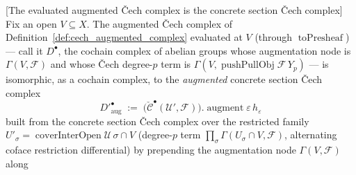 \begin{lemma}

[The evaluated augmented {\v C}ech complex is the concrete section {\v C}ech complex]
  \label{lem:cechSection_complex_iso}
  Fix an open \(V \subseteq X\). The augmented {\v C}ech complex of
  Definition~\ref{def:cech_augmented_complex} evaluated at \(V\) (through
  \(\operatorname{toPresheaf}\)) --- call it \(D^\bullet\), the cochain complex of abelian
  groups whose augmentation node is \(\Gamma(V, \mathcal{F})\) and whose {\v C}ech degree-\(p\)
  term is \(\Gamma(V, \operatorname{pushPullObj}\mathcal{F}\,Y_p)\) --- is isomorphic, as a
  cochain complex, to the \emph{augmented} concrete section {\v C}ech complex
  \[
    D'^\bullet_{\mathrm{aug}} \;:=\;
    \bigl(\check{\mathcal{C}}^\bullet(\mathcal{U}', \mathcal{F})\bigr).\operatorname{augment}
      \varepsilon\, h_\varepsilon
  \]
  built from the concrete section {\v C}ech complex over the restricted family
  \(U'_\sigma = \operatorname{coverInterOpen}\mathcal{U}\,\sigma \cap V\) (degree-\(p\) term
  \(\prod_\sigma \Gamma(U_\sigma \cap V, \mathcal{F})\), alternating coface restriction
  differential) by prepending the augmentation node \(\Gamma(V, \mathcal{F})\) along

\end{lemma}
